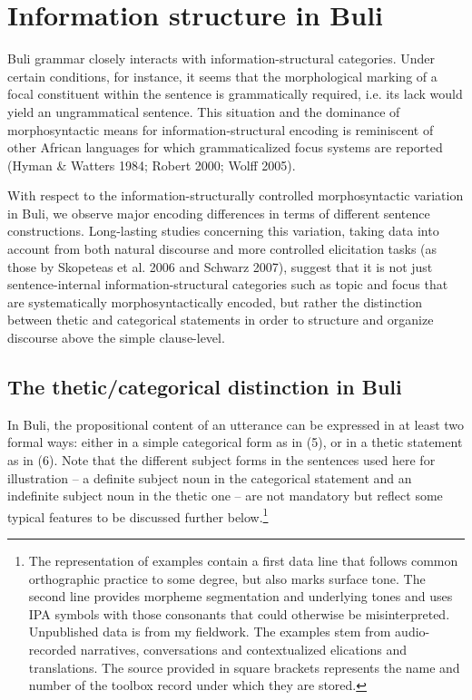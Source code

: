 \documentclass[output=paper]{langsci/langscibook}
\begin{document}
\section{ Information structure in Buli}

Buli grammar closely interacts with information-structural categories. Under certain conditions, for instance, it seems that the morphological marking of a focal constituent within the sentence is grammatically required, i.e. its lack would yield an ungrammatical sentence. This situation and the dominance of morphosyntactic means for information-structural encoding is reminiscent of other African languages for which grammaticalized focus systems are reported (Hyman \& Watters 1984; Robert 2000; Wolff 2005). 

With respect to the information-structurally controlled morphosyntactic variation in Buli, we observe major encoding differences in terms of different sentence constructions. Long-lasting studies concerning this variation, taking data into account from both natural discourse and more controlled elicitation tasks (as those by Skopeteas et al. 2006 and Schwarz 2007), suggest that it is not just sentence-internal information-structural categories such as topic and focus that are systematically morphosyntactically encoded, but rather the distinction between thetic and categorical statements in order to structure and organize discourse above the simple clause-level. 

\subsection{The thetic/categorical distinction in Buli}

In Buli, the propositional content of an utterance can be expressed in at least two formal ways: either in a simple categorical form as in (5), or in a thetic statement as in (6). Note that the different subject forms in the sentences used here for illustration – a definite subject noun in the categorical statement and an indefinite subject noun in the thetic one – are not mandatory but reflect some typical features to be discussed further below.\footnote{ The representation of examples contain a first data line that follows common orthographic practice to some degree, but also marks surface tone. The second line provides morpheme segmentation and underlying tones and uses IPA symbols with those consonants that could otherwise be misinterpreted. Unpublished data is from my fieldwork. The examples stem from audio-recorded narratives, conversations and contextualized elications and translations. The source provided in square brackets represents the name and number of the toolbox record under which they are stored.} 
 
\end{document}
